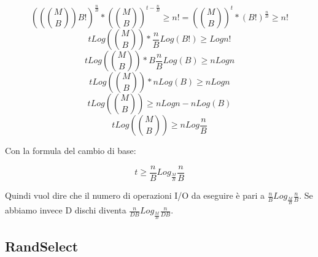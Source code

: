 \documentclass[12pt]{article}
\begin{document}
\begin{equation}
    ((\binom{M}{B})B!)^{\frac{n}{B}} * (\binom{M}{B})^{t-\frac{n}{B}} \geq n! = (\binom{M}{B})^{t}*(B!)^{\frac{n}{B}}\geq n!
\end{equation}
\begin{equation}
    t Log(\binom{M}{B}) * \frac{n}{B}Log(B!) \geq Log n!
\end{equation}
\begin{equation}
    t Log(\binom{M}{B}) * B\frac{n}{B}Log(B) \geq nLog n
\end{equation}
\begin{equation}
    t Log(\binom{M}{B}) * n Log(B) \geq n Log n
\end{equation}
\begin{equation}
    t Log(\binom{M}{B}) \geq n Log n - n Log(B)
\end{equation}
\begin{equation}
    t Log(\binom{M}{B}) \geq n Log \frac{n}{B}
\end{equation}

Con la formula del cambio di base:

\begin{equation}
    t \geq \frac{n}{B} Log_{\frac{M}{B}} \frac{n}{B}
\end{equation}

Quindi vuol dire che il numero di operazioni I/O da eseguire è pari a $\frac{n}{B} Log_{\frac{M}{B}} \frac{n}{B}$.
Se abbiamo invece D dischi diventa $\frac{n}{DB} Log_{\frac{M}{B}} \frac{n}{DB}$.


\subsection{RandSelect}
\end{document}
